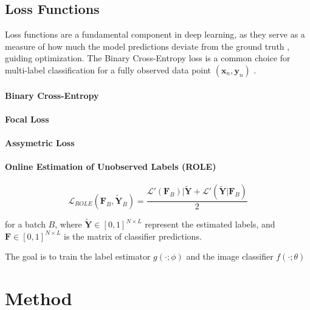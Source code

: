 \documentclass[lettersize,journal]{IEEEtran}
\begin{document}
\subsection{Loss Functions}
Loss functions are a fundamental component in deep learning, as they serve as a measure of how much the model predictions deviate from the ground truth \cite{zhang2023dive}, guiding optimization. The Binary Cross-Entropy loss is a common choice for multi-label classification for a fully observed data point $(\mathbf{x}_n,\mathbf{y}_n)$ \cite{mlsp}. 

\paragraph{Binary Cross-Entropy}


\paragraph{Focal Loss}

\paragraph{Assymetric Loss}

\paragraph{Online Estimation of Unobserved Labels (ROLE)}

\begin{equation}
    \mathcal{L}_{ROLE}(\mathbf{F}_B, \mathbf{\tilde{Y}}_B) = \frac{\mathcal{L}'(\mathbf{F}_B)|\mathbf{\tilde{Y}}+\mathcal{L}'(\mathbf{\tilde{Y}}|\mathbf{F}_B)}{2}
\end{equation}

for a batch $B$, where $\mathbf{\tilde{Y}}\in[0,1]^{N\times L}$ represent the estimated labels, and $\mathbf{F}\in[0,1]^{N\times L}$ is the matrix of classifier predictions.

The goal is to train the label estimator $g(\cdot;\phi)$ and the image classifier $f(\cdot;\theta)$




\section{Method}
\end{document}
